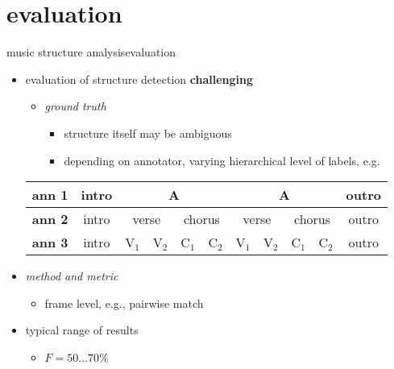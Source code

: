     \section[evaluation]{evaluation}
        \begin{frame}{music structure analysis}{evaluation}
            \begin{itemize}
                \item   evaluation of structure detection \textbf{challenging}
                    \begin{itemize}
                        \item   \textit{ground truth}
                            \begin{itemize}
                                \item   structure itself may be ambiguous
                                \item   depending on annotator, varying hierarchical level of labels, e.g.
                            \end{itemize}
                    \end{itemize}
                    \begin{table}
                        \centering
                        \footnotesize
                            \begin{tabular}{l|c|c|c|c|c|c|c|c|c|c|}
                                    \hline
                                  \textbf{ann 1} & intro & \multicolumn{4}{c|}{A} & \multicolumn{4}{c|}{A} & outro\\ \hline
                                  \textbf{ann 2} & intro & \multicolumn{2}{c|}{verse} & \multicolumn{2}{c|}{chorus} & \multicolumn{2}{c|}{verse} & \multicolumn{2}{c|}{chorus} & outro\\ \hline
                                  \textbf{ann 3} & intro & V$_1$ & V$_2$ & C$_1$ &C$_2$ &  V$_1$ & V$_2$ & C$_1$ &C$_2$ & outro\\
                                    \hline
                            \end{tabular}
                    \end{table}
                \bigskip
                \item<2->   \textit{method and metric}
                    \begin{itemize}
                        \item   frame level, e.g., pairwise match
                    \end{itemize}
                \bigskip
                \item<3->   typical range of results
                    \begin{itemize}
                        \item   $F = 50\ldots 70\% $
                    \end{itemize}
            \end{itemize}
        \end{frame}
       
